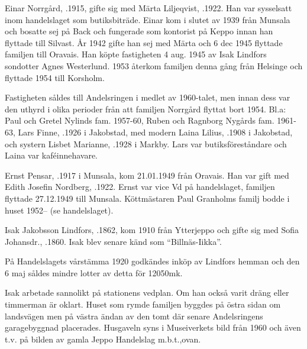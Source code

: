 Einar Norrgård, .1915, gifte sig med Märta Liljeqvist, .1922. Han var sysselsatt inom handelslaget som butiksbiträde. Einar kom i slutet av 1939 från Munsala och bosatte sej på Back och fungerade som kontorist på Keppo innan han flyttade till Silvast. År 1942 gifte han sej med Märta och 6 dec 1945 flyttade familjen till Oravais. Han köpte fastigheten 4 aug. 1945 av Isak Lindfors sondotter Agnes Westerlund. 1953 återkom familjen denna gång från Helsinge och flyttade 1954 till Korsholm.
\begin{jhchildren}
  \item {}
  \item {}
  \item {}
\end{jhchildren}

Fastigheten såldes till Andelsringen i medlet av 1960-talet, men innan dess var den uthyrd i olika perioder från att familjen Norrgård flyttat bort 1954. Bl.a: Paul och Gretel Nylinds fam. 1957-60, Ruben och Ragnborg Nygårds fam. 1961-63, Lars Finne, .1926 i Jakobstad, med modern Laina Lilius, .1908 i Jakobstad, och systern Lisbet Marianne, .1928 i Markby. Lars var butiksföreståndare och Laina var kaféinnehavare.

Ernst Pensar, .1917 i Munsala, kom 21.01.1949 från Oravais. Han var gift med Edith Josefin Nordberg, .1922. Ernst var vice Vd på handelslaget, familjen flyttade 27.12.1949 till Munsala. Köttmästaren Paul Granholms familj bodde i huset 1952--  (se handelslaget).


Isak Jakobsson Lindfors, .1862, kom 1910 från Ytterjeppo och gifte sig med Sofia Johansdr., .1860. Isak blev senare känd som ``Billnäs-Iikka''.

På Handelslagets vårstämma 1920 godkändes inköp av Lindfors hemman och den 6 maj såldes mindre lotter av detta för 12050mk.

Isak arbetade sannolikt på stationens vedplan. Om han också varit dräng eller timmerman är oklart. Huset som rymde familjen byggdes på östra sidan om landsvägen men på västra ändan av den tomt där senare Andelsringens garagebyggnad placerades. Husgaveln syns i Museiverkets bild från 1960 och även t.v. på bilden av gamla Jeppo Handelslag m.b.t.,ovan.
\begin{jhchildren}
  \item {}
  \item {}
  \item {}
\end{jhchildren}

